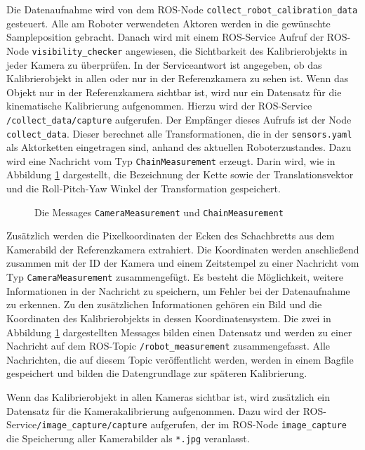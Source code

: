 Die Datenaufnahme wird von dem \ac{ROS}-Node \texttt{collect\_robot\_\allowbreak calibration\_\allowbreak data}
gesteuert. Alle am Roboter verwendeten Aktoren werden  in
die gewünschte Sampleposition gebracht. Danach wird mit einem \ac{ROS}-Service
Aufruf der \ac{ROS}-Node \texttt{visibility\_checker} angewiesen, die Sichtbarkeit
des Kalibrierobjekts in jeder Kamera zu überprüfen. In der Serviceantwort ist
angegeben, ob das 
Kalibrierobjekt in allen oder nur in der Referenzkamera zu sehen ist. 
Wenn das Objekt nur in der Referenzkamera sichtbar ist, wird nur ein Datensatz
für die kinematische Kalibrierung aufgenommen. Hierzu wird der \ac{ROS}-Service
\texttt{/collect\_data/capture} aufgerufen. Der Empfänger dieses Aufrufs ist 
der Node \texttt{collect\_data}. Dieser berechnet alle Transformationen, die in 
der \texttt{sensors.yaml} als Aktorketten eingetragen sind, anhand des aktuellen
Roboterzustandes. Dazu wird eine Nachricht vom Typ \texttt{ChainMeasurement}
erzeugt. Darin wird, wie in Abbildung \ref{fig:messages} dargestellt, die Bezeichnung der 
Kette sowie der Translationsvektor und die Roll-Pitch-Yaw Winkel der Transformation 
gespeichert.
\begin{figure}[htpb]
  \centering
  
  \caption{Die Messages \texttt{CameraMeasurement} und \texttt{ChainMeasurement}}
  \label{fig:messages}
\end{figure}
Zusätzlich werden die Pixelkoordinaten der Ecken des Schachbretts
aus dem Kamerabild der Referenzkamera extrahiert. Die Koordinaten werden anschließend 
zusammen mit der ID der Kamera und einem Zeitstempel zu einer Nachricht vom Typ 
\texttt{CameraMeasurement} zusammengefügt. Es besteht die Möglichkeit, weitere Informationen
in der Nachricht zu speichern, um Fehler bei der Datenaufnahme zu erkennen.
Zu den zusätzlichen Informationen gehören ein Bild und die Koordinaten des 
Kalibrierobjekts in dessen Koordinatensystem. Die zwei in Abbildung \ref{fig:messages}
dargestellten Messages%
bilden einen Datensatz und werden zu einer Nachricht auf dem \ac{ROS}-Topic
\texttt{/robot\_measurement} zusammengefasst. Alle Nachrichten, die auf diesem 
Topic veröffentlicht werden, werden in einem Bagfile gespeichert und bilden die
Datengrundlage zur späteren Kalibrierung.

Wenn das Kalibrierobjekt in allen Kameras sichtbar ist, wird zusätzlich ein 
Datensatz für die Kamerakalibrierung aufgenommen. Dazu wird der
\ac{ROS}-Service\break \texttt{/image\_capture/\allowbreak capture} aufgerufen, der im \ac{ROS}-Node \texttt{image\_capture}
die Speicherung aller Kamerabilder als \texttt{*.jpg} veranlasst.

